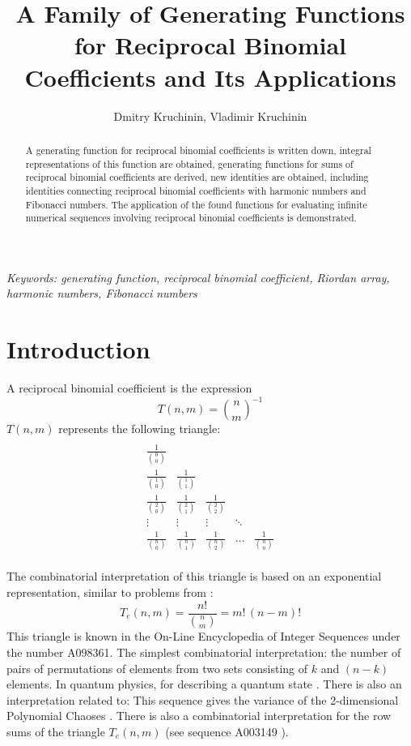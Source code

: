 \documentclass[12pt]{article}
\begin{document}
\title{A Family of Generating Functions for Reciprocal Binomial Coefficients and Its Applications}

\author{ Dmitry Kruchinin, Vladimir Kruchinin}

\maketitle

\begin{abstract}
A generating function for reciprocal binomial coefficients is written down, integral representations of this function are obtained, generating functions for sums of reciprocal binomial coefficients are derived, new identities are obtained, including identities connecting reciprocal binomial coefficients with harmonic numbers and Fibonacci numbers. The application of the found functions for evaluating infinite numerical sequences involving reciprocal binomial coefficients is demonstrated.
\end{abstract}

\noindent \textit{Keywords: generating function, reciprocal binomial coefficient, Riordan array, harmonic numbers, Fibonacci numbers}

\section{Introduction}

A reciprocal binomial coefficient is the expression
$$
T(n,m)={\binom{n}{m}}^{-1}
$$
$T(n,m)$ represents the following triangle:
$$
\begin{array}{ccccc}\\
\frac{1}{\binom{0}{0}}\\
\frac{1}{\binom{1}{0}}&\frac{1}{\binom{1}{1}}\\
\frac{1}{\binom{2}{0}}&\frac{1}{\binom{2}{1}}&\frac{1}{\binom{2}{2}}\\
\vdots& \vdots & \vdots &  \ddots\\
\frac{1}{\binom{n}{0}}&\frac{1}{\binom{n}{1}}&\frac{1}{\binom{n}{2}}&\ldots&\frac{1}{\binom{n}{n}}\\

\end{array}
$$

The combinatorial interpretation of this triangle is based on an exponential representation, similar to problems from \cite{Graham}:
$$
T_e(n,m)=\frac{n!}{\binom{n}{m}}=m!\,(n-m)!
$$
This triangle is known in the On-Line Encyclopedia of Integer Sequences under the number A098361\cite{A098361}. The simplest combinatorial interpretation: the number of pairs of permutations of elements from two sets consisting of $k$ and $(n-k)$ elements. In quantum physics, for describing a quantum state \cite{RBS}. There is also an interpretation related to: This sequence gives the variance of the 2-dimensional Polynomial Chaoses \cite{Ghanem}. There is also a combinatorial interpretation for the row sums of the triangle $T_e(n,m)$ (see sequence A003149 \cite{A003149}).
\end{document}

